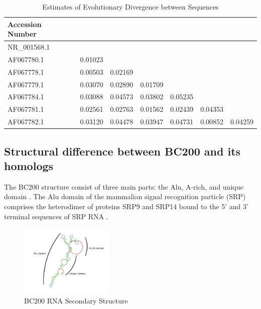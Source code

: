 \documentclass[conference, 11pt]{IEEEtran}
\begin{document}
\begin{table}[h]
  \centering
  \caption{Estimates of Evolutionary Divergence between Sequences}
  \label{tbl:distances}
  \begin{tabular}{lcccccc}
    \toprule
    Accession Number \\
    \midrule
    NR\_001568.1 \\
    AF067780.1 & 0.01023 \\
    AF067778.1 & 0.00503 & 0.02169 \\
    AF067779.1 & 0.03070 & 0.02890 & 0.01709 \\ 
    AF067784.1 & 0.03088 & 0.04573 & 0.03802 & 0.05235 \\
    AF067781.1 & 0.02561 & 0.02763 & 0.01562 & 0.02439 & 0.04353 \\ 
    AF067782.1 & 0.03120 & 0.04478 & 0.03947 & 0.04731 & 0.00852 & 0.04259 \\
    \bottomrule
  \end{tabular}
\end{table}

\subsection{Structural difference between BC200 and its homologs}\label{sec:results-structure}

The BC200 structure consist of three main parts: the Alu, A-rich, and unique domain \cite{jung2014rna}.
The Alu domain of the mammalian signal recognition particle (SRP) comprises the heterodimer of proteins SRP9 and SRP14 bound to the 5' and 3' terminal sequences of SRP RNA \cite{weichenrieder2000structure}. 

\begin{figure}[h]
  \centering
  \includegraphics[width=0.4\textwidth]{figs/rna-6.png}
  \caption{BC200 RNA Secondary Structure}
  \label{fig:bc200-structure}
\end{figure}
\end{document}
